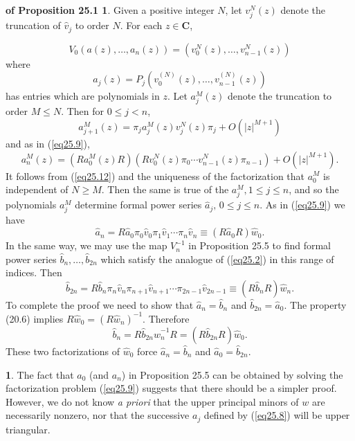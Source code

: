 \documentclass{surv-l}
\theoremstyle{plain}
\theoremstyle{definition}
\newtheorem*{pop}{\sc{Proof} of Proposition 25.1}
\newtheorem{remark}[theorem]{\sc{Remark}}
\numberwithin{equation}{chapter}
\begin{document}
\begin{pop}\label{pop25.1}
Given a positive integer $N$, let $v_{j}^{N}(z)$ denote the truncation of $\hat{v}_{j}$ to order $N$. For each $z\in \mathbf{C}$,
\end{pop}
\begin{equation*}
V_{0}(a(z), \ldots, a_{n}(z))=(v_{0}^{N}(z), \ldots, v_{n-1}^{N}(z))
\end{equation*}
where
\begin{equation*}
a_{j}(z)=P_{j}(v_{0}^{(N)}(z), \ldots,v_{n-1}^{(N)}(z))
\end{equation*}
has entries which are polynomials in $z$. Let $a_{j}^{M}(z)$ denote the truncation to order $M\leq N$. Then for $0\leq j<n$,
\begin{equation*}
a_{j+1}^{M}(z)=\pi_{j}a_{j}^{M}(z)v_{j}^{N}(z)\pi_{j}+O(|z|^{M+1})
\end{equation*}
and as in (\ref{eq25.9}),
\begin{equation}\label{eq25.12}
a_{n}^{M}(z)=(Ra_{0}^{M}(z)R)(Rv_{0}^{N}(z)\pi_{0}\cdots v_{n-1}^{N}(z)\pi_{n-1})+O(|z|^{M+1}).
\end{equation}
It follows from (\ref{eq25.12}) and the uniqueness of the factorization that $a_{0}^{M}$ is independent of $N\geq M$. Then the same is true of the $a_{j}^{M}, 1\leq j\leq n$, and so the polynomials $a_{j}^{M}$ determine formal power series $\hat{a}_{j},\, 0\leq j\leq n$. As in (\ref{eq25.9}) we have
\begin{equation*}
\hat{a}_{n}=R\hat{a}_{0}\pi_{0}\hat{v}_{0}\pi_{1}\hat{v}_{1}\cdots\pi_{n}\hat{v}_{n}\equiv(R\hat{a}_{0}R)\hat{w}_{0}.
\end{equation*}
In the same way, we may use the map $V_{n}^{-1}$ in Proposition 25.5 to find formal power series $\hat{b}_{n},\ldots,\hat{b}_{2n}$ which satisfy the analogue of (\ref{eq25.2}) in this range of indices. Then
\begin{equation*}
\hat{b}_{2n}=R\hat{b}_{n}\pi_{n}\hat{v}_{n}\pi_{n+1}\hat{v}_{n+1}\cdots\pi_{2n-1}\hat{v}_{2n-1}\equiv(R\hat{b}_{n}R)\hat{w}_{n}.
\end{equation*}
To complete the proof we need to show that $\hat{a}_{n}=\hat{b}_{n}$ and $\hat{b}_{2n}=\hat{a}_{0}$. The property (20.6) implies $R\hat{w}_{0}=(R\hat{w}_{n})^{-1}$. Therefore
\begin{equation*}
\hat{b}_{n}=R\hat{b}_{2n}\hat{w}_{n}^{-1}R=(R\hat{b}_{2n}R)\hat{w}_{0}.
\end{equation*}
These two factorizations of $\hat{w}_{0}$ force $\hat{a}_{n}=\hat{b}_{n}$ and $\hat{a}_{0}=\hat{b}_{2n}$.
\renewcommand\thetheorem{25.13}
\begin{remark}\label{rem25.13}
The fact that $a_{0}$ (and $a_{n}$) in Proposition 25.5 can be obtained by solving the factorization problem (\ref{eq25.9}) suggests that there should be a simpler proof. However, we do not know \emph{a priori} that the upper principal minors of $w$ are necessarily nonzero, nor that the successive $a_{j}$ defined by (\ref{eq25.8}) will be upper triangular.
\end{remark}
\end{document}
